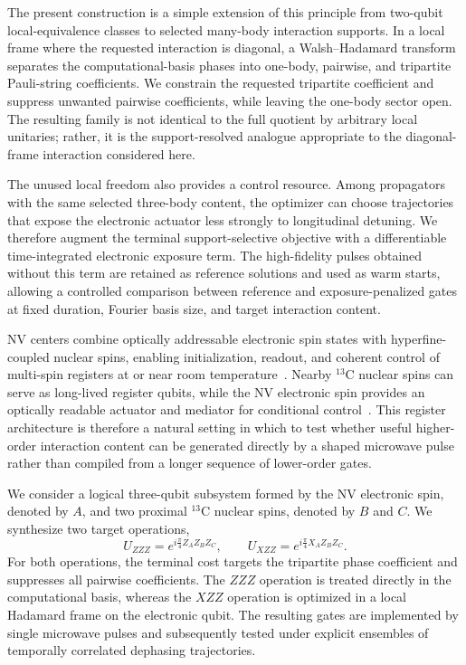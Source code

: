 \documentclass[
  aps,
  pra,
  reprint,            %
  superscriptaddress, %
  amsmath,amssymb,
  notitlepage
]{revtex4-2}
\begin{document}
\medskip
\noindent
The present construction is a simple extension of this principle from two-qubit local-equivalence classes to selected many-body interaction supports. In a local frame where the requested interaction is diagonal, a Walsh--Hadamard transform separates the computational-basis phases into one-body, pairwise, and tripartite Pauli-string coefficients. We constrain the requested tripartite coefficient and suppress unwanted pairwise coefficients, while leaving the one-body sector open. The resulting family is not identical to the full quotient by arbitrary local unitaries; rather, it is the support-resolved analogue appropriate to the diagonal-frame interaction considered here.

\medskip
\noindent
The unused local freedom also provides a control resource. Among propagators with the same selected three-body content, the optimizer can choose trajectories that expose the electronic actuator less strongly to longitudinal detuning. We therefore augment the terminal support-selective objective with a differentiable time-integrated electronic exposure term. The high-fidelity pulses obtained without this term are retained as reference solutions and used as warm starts, allowing a controlled comparison between reference and exposure-penalized gates at fixed duration, Fourier basis size, and target interaction content.

NV centers combine optically addressable electronic spin states with hyperfine-coupled nuclear spins, enabling initialization, readout, and coherent control of multi-spin registers at or near room temperature~\cite{phila,Schir,neumann,rembold2020introduction}. Nearby $^{13}\mathrm C$ nuclear spins can serve as long-lived register qubits, while the NV electronic spin provides an optically readable actuator and mediator for conditional control~\cite{Taminiau,childress,wang2025circuit}. This register architecture is therefore a natural setting in which to test whether useful higher-order interaction content can be generated directly by a shaped microwave pulse rather than compiled from a longer sequence of lower-order gates.

We consider a logical three-qubit subsystem formed by the NV electronic spin, denoted by $A$, and two proximal $^{13}\mathrm C$ nuclear spins, denoted by $B$ and $C$. We synthesize two target operations,
\begin{equation}
U_{ZZZ}=e^{i\frac{\pi}{4}Z_AZ_BZ_C},
\qquad
U_{XZZ}=e^{i\frac{\pi}{4}X_AZ_BZ_C}.
\label{eq:introduction_target_gates}
\end{equation}
For both operations, the terminal cost targets the tripartite phase coefficient and suppresses all pairwise coefficients. The $ZZZ$ operation is treated directly in the computational basis, whereas the $XZZ$ operation is optimized in a local Hadamard frame on the electronic qubit. The resulting gates are implemented by single microwave pulses and subsequently tested under explicit ensembles of temporally correlated dephasing trajectories.
\end{document}

